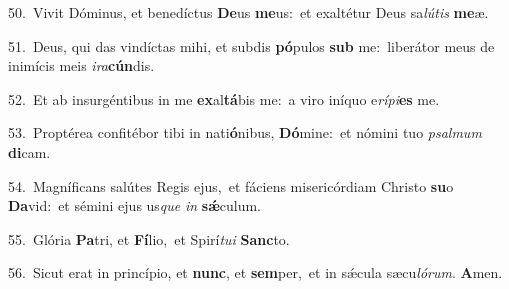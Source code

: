 {\numbfont\textcolor{\numbcolor}{50.}}~Vivit Dóminus, et benedíctus \textbf{De}\-us \textbf{me}\-us:~\star et exaltétur Deus sa\-\textit{lú}\-\textit{tis} \textbf{me}\-æ.\par
{\numbfont\textcolor{\numbcolor}{51.}}~Deus, qui das vindíctas mihi, et subdis \textbf{pó}\-pulos \textbf{sub} me:~\star liberátor meus de inimícis meis \textit{i}\-\textit{ra}\textbf{cún}dis.\par
{\numbfont\textcolor{\numbcolor}{52.}}~Et ab insurgéntibus in me \textbf{ex}\-al\-\textbf{tá}\-bis me:~\star a viro iníquo e\-\textit{rí}\-\textit{pi}\textbf{es} me.\par
{\numbfont\textcolor{\numbcolor}{53.}}~Proptérea confitébor tibi in nati\-\textbf{ó}\-nibus, \textbf{Dó}\-mine:~\star et nómini tuo \textit{psal}\-\textit{mum} \textbf{di}\-cam.\par
{\numbfont\textcolor{\numbcolor}{54.}}~Magníficans salútes Regis ejus,~\dagger et fáciens misericórdiam Christo \textbf{su}\-o \textbf{Da}\-vid:~\star et sémini ejus us\textit{que} \textit{in} \textbf{sǽ}\-culum.\par
{\numbfont\textcolor{\numbcolor}{55.}}~Glória \textbf{Pa}\-tri, et \textbf{Fí}\-lio,~\star et Spirí\-\textit{tu}\-\textit{i} \textbf{Sanc}\-to.\par
{\numbfont\textcolor{\numbcolor}{56.}}~Sicut erat in princípio, et \textbf{nunc}\-, et \textbf{sem}\-per,~\star et in sǽcula sæcu\-\textit{ló}\-\textit{rum}. \textbf{A}\-men.\par
